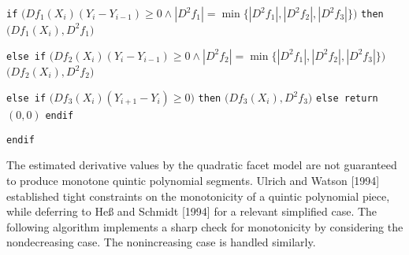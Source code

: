 {\itemitem{} {\tt if} $\bigl(Df_1(X_i)(Y_i-Y_{i-1}) \ge 0 \wedge
  |D^2f_1| = \min\bigl\{ |D^2f_1|,
  |D^2f_2|, |D^2f_3|\bigr\} \bigr)$ {\tt then}
\itemitem{}  $\bigl(Df_1(X_i),D^2f_1\bigr)$

\itemitem{} {\tt else if} $\bigl(Df_2(X_i)(Y_i-Y_{i-1}) \ge 0 \wedge
  |D^2f_2| = \min\bigl\{ |D^2f_1|,
  |D^2f_2|, |D^2f_3|\bigr\} \bigr)$
\itemitem{}  $\bigl(Df_2(X_i),D^2f_2\bigr)$

\itemitem{} {\tt else if} $\bigl(Df_3(X_i)(Y_{i+1}-Y_i) \ge 0\bigr)$ {\tt then}
\itemitem{}  $\bigl(Df_3(X_i),D^2f_3\bigr)$
\itemitem{} {\tt else return} $(0, 0)$
\itemitem{} {\tt endif}
\item{} {\tt endif}
}
\vskip 5mm

The estimated derivative values by the quadratic facet model are not
guaranteed to produce monotone quintic polynomial segments. Ulrich and
Watson [1994] established tight constraints on the monotonicity of a
quintic polynomial piece, while deferring to He{\ss} and Schmidt
[1994] for a relevant simplified case. The following algorithm
implements a sharp check for monotonicity by considering the
nondecreasing case. The nonincreasing case is handled similarly.

